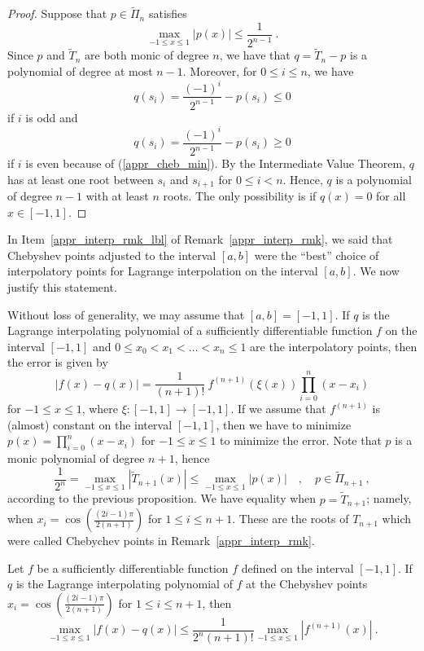 \begin{proof}
Suppose that $p\in \tilde{\Pi}_n$ satisfies
\begin{equation} \label{appr_cheb_min}
\max_{-1\leq x \leq 1} \left|p(x)\right| \leq \frac{1}{2^{n-1}} \  .
\end{equation}
Since $p$ and $\tilde{T}_n$ are both monic of degree $n$, we have that
$q = \tilde{T}_n-p$ is a polynomial of degree at most $n-1$.  Moreover,
for $0 \leq i \leq n$, we have
\[
  q(s_i) = \frac{(-1)^i}{2^{n-1}} - p(s_i) \leq 0
\]
if $i$ is odd and
\[
  q(s_i) = \frac{(-1)^i}{2^{n-1}} - p(s_i) \geq 0
\]
if $i$ is even because of (\ref{appr_cheb_min}).  By the Intermediate
Value Theorem, $q$ has 
at least one root between $s_i$ and $s_{i+1}$ for $0\leq i < n$.  Hence, $q$
is a polynomial of degree $n-1$ with at least $n$ roots.  The only
possibility is if $q(x) = 0$ for all $x \in [-1,1]$.
\end{proof}

In Item~\ref{appr_interp_rmk_lbl} of Remark~\ref{appr_interp_rmk}, we said
that Chebyshev points adjusted to the interval $[a,b]$ were the ``best''
choice of interpolatory points for Lagrange interpolation on the interval
$[a,b]$.  We now justify this statement.

Without loss of generality, we may assume that $[a,b]=[-1,1]$.
If $q$ is the Lagrange interpolating polynomial of a sufficiently
differentiable function $f$ on the interval $[-1,1]$ and
$0\leq x_0 < x_1 < \ldots < x_n\leq 1$ are the interpolatory points, then the
error is given by
\[
\left| f(x) - q(x) \right| = \frac{1}{(n+1)!}\  f^{(n+1)}(\xi(x))
\prod_{i=0}^n (x-x_i)
\]
for $-1 \leq x \leq 1$, where $\xi:[-1,1]\rightarrow [-1,1]$.  If we
assume that $f^{(n+1)}$ is (almost) constant on the interval $[-1,1]$,
then we have to minimize
$\displaystyle p(x) = \prod_{i=0}^n (x-x_i)$ for $-1 \leq x \leq 1$
to minimize the error.  Note that $p$ is a monic polynomial of degree
$n+1$, hence
\[
\frac{1}{2^n} = \max_{-1\leq x \leq 1} \left| \tilde{T}_{n+1}(x)\right| \leq
\max_{-1\leq x \leq 1} \left| p(x) \right| \quad , \quad p \in
\tilde{\Pi}_{n+1} \  ,
\]
according to the previous proposition.  We have equality when
$p=\tilde{T}_{n+1}$; namely, when
$\displaystyle x_i = \cos\left(\frac{(2i-1)\pi}{2(n+1)}\right)$
for $1\leq i \leq n+1$.  These are the roots of $T_{n+1}$ which were
called Chebychev points in Remark~\ref{appr_interp_rmk}.

\begin{prop}
Let $f$ be a sufficiently differentiable function $f$ defined on the interval
$[-1,1]$.  If $q$ is the Lagrange interpolating polynomial of $f$ at the
Chebyshev points
$\displaystyle x_i = \cos\left(\frac{(2i-1)\pi}{2(n+1)}\right)$
for $1\leq i \leq n+1$, then
\[
\max_{-1\leq x \leq 1} \left| f(x) - q(x) \right| \leq
\frac{1}{2^n (n+1)!}\max_{-1\leq x \leq 1} \left| f^{(n+1)}(x) \right| \  .
\]
\label{ChebyshevTrancMax}
\end{prop}

